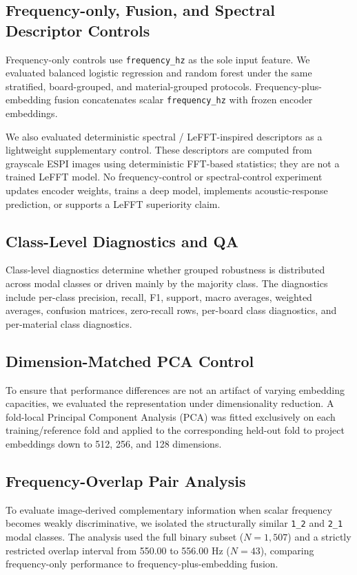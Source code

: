 \documentclass[review,3p,times]{elsarticle}
\begin{document}
\subsection{Frequency-only, Fusion, and Spectral Descriptor Controls}
Frequency-only controls use \texttt{frequency\_hz} as the sole input feature. We evaluated balanced logistic regression and random forest under the same stratified, board-grouped, and material-grouped protocols. Frequency-plus-embedding fusion concatenates scalar \texttt{frequency\_hz} with frozen encoder embeddings.

We also evaluated deterministic spectral / LeFFT-inspired descriptors as a lightweight supplementary control. These descriptors are computed from grayscale ESPI images using deterministic FFT-based statistics; they are not a trained LeFFT model. No frequency-control or spectral-control experiment updates encoder weights, trains a deep model, implements acoustic-response prediction, or supports a LeFFT superiority claim.

\subsection{Class-Level Diagnostics and QA}
Class-level diagnostics determine whether grouped robustness is distributed across modal classes or driven mainly by the majority class. The diagnostics include per-class precision, recall, F1, support, macro averages, weighted averages, confusion matrices, zero-recall rows, per-board class diagnostics, and per-material class diagnostics.

\subsection{Dimension-Matched PCA Control}
To ensure that performance differences are not an artifact of varying embedding capacities, we evaluated the representation under dimensionality reduction. A fold-local Principal Component Analysis (PCA) was fitted exclusively on each training/reference fold and applied to the corresponding held-out fold to project embeddings down to 512, 256, and 128 dimensions.

\subsection{Frequency-Overlap Pair Analysis}
To evaluate image-derived complementary information when scalar frequency becomes weakly discriminative, we isolated the structurally similar \texttt{1\_2} and \texttt{2\_1} modal classes. The analysis used the full binary subset ($N=1{,}507$) and a strictly restricted overlap interval from 550.00 to 556.00 Hz ($N=43$), comparing frequency-only performance to frequency-plus-embedding fusion.
\end{document}
